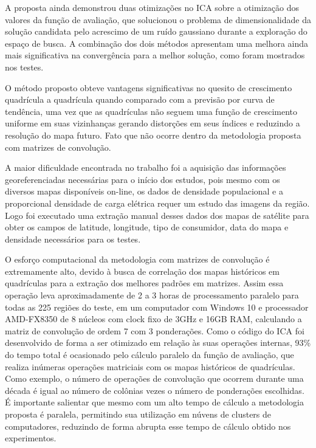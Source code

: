 A proposta ainda demonstrou duas otimizações no ICA sobre a otimização dos valores da função de avaliação, que solucionou o problema de dimensionalidade da solução candidata pelo acrescimo de um ruído gaussiano durante a exploração do espaço de busca. A combinação dos dois métodos apresentam uma melhora ainda mais significativa na convergência para a melhor solução, como foram mostrados nos testes. 

O método proposto obteve vantagens significativas no quesito de crescimento quadrícula a quadrícula quando comparado com a previsão por curva de tendência, uma vez que as quadrículas não seguem uma função de crescimento uniforme em suas vizinhanças gerando distorções em seus índices e reduzindo a resolução do mapa futuro. Fato que não ocorre dentro da metodologia proposta com matrizes de convolução.

A maior dificuldade encontrada no trabalho foi a aquisição das informações georeferenciadas necessárias para o início dos estudos, pois mesmo com os diversos mapas disponíveis on-line, os dados de densidade populacional e a proporcional densidade de carga elétrica requer um estudo das imagens da região. Logo foi executado uma extração manual desses dados dos mapas de satélite para obter os campos de latitude, longitude, tipo de consumidor, data do mapa e densidade necessários para os testes.

O esforço computacional da metodologia com matrizes de convolução é extremamente alto, devido à busca de correlação dos mapas históricos em quadrículas para a extração dos melhores padrões em matrizes. Assim essa operação leva aproximadamente de 2 a 3 horas de processamento paralelo para todas as 225 regiões do teste, em um computador com Windows 10 e processador AMD-FX8350 de 8 núcleos com clock fixo de 3GHz e 16GB RAM, calculando a matriz de convolução de ordem 7 com 3 ponderações. Como o código do ICA foi desenvolvido de forma a ser otimizado em relação às suas operações internas, 93\% do tempo total é ocasionado pelo cálculo paralelo da função de avaliação, que realiza inúmeras operações matriciais com os mapas históricos de quadrículas. Como exemplo, o número de operações de convolução que ocorrem durante uma década é igual ao número de colônias vezes o número de ponderações escolhidas. É importante salientar que mesmo com um alto tempo de cálculo a metodologia proposta é paralela, permitindo sua utilização em núvens de clusters de computadores, reduzindo de forma abrupta esse tempo de cálculo obtido nos experimentos.

